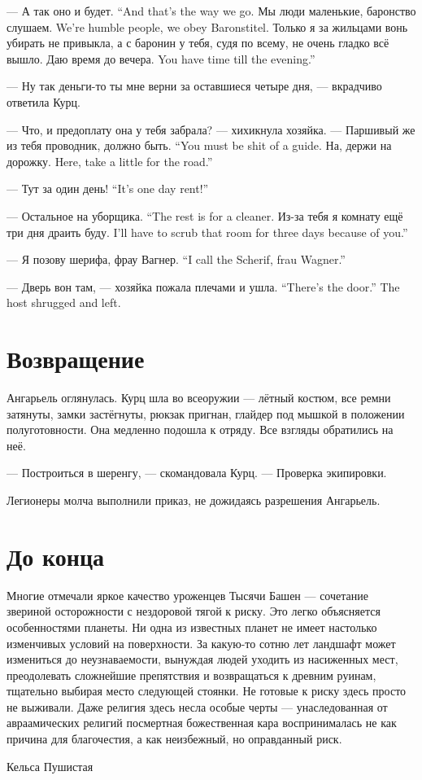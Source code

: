{--- А так оно и будет.}
{``And that's the way we go.}
{Мы люди маленькие, баронство слушаем.}
{We're humble people, we obey Baronstitel.}
Только я за жильцами вонь убирать не привыкла, а с баронин у тебя, судя по всему, не очень гладко всё вышло.
{Даю время до вечера.}
{You have time till the evening.''}

--- Ну так деньги-то ты мне верни за оставшиеся четыре дня, --- вкрадчиво ответила Курц.

--- Что, и предоплату она у тебя забрала? --- хихикнула хозяйка.
{--- Паршивый же из тебя проводник, должно быть.}
{``You must be shit of a guide.}
{На, держи на дорожку.}
{Here, take a little for the road.''}

{--- Тут за один день!}
{``It's one day rent!''}

{--- Остальное на уборщика.}
{``The rest is for a cleaner.}
{Из-за тебя я комнату ещё три дня драить буду.}
{I'll have to scrub that room for three days because of you.''}

{--- Я позову шерифа, фрау Вагнер.}
{``I call the Scherif, frau Wagner.''}

{--- Дверь вон там, --- хозяйка пожала плечами и ушла.}
{``There's the door.'' The host shrugged and left.}

\section{Возвращение}

Ангарьель оглянулась.
Курц шла во всеоружии --- лётный костюм, все ремни затянуты, замки застёгнуты, рюкзак пригнан, глайдер под мышкой в положении полуготовности.
Она медленно подошла к отряду.
Все взгляды обратились на неё.

--- Построиться в шеренгу, --- скомандовала Курц.
--- Проверка экипировки.

Легионеры молча выполнили приказ, не дожидаясь разрешения Ангарьель.

\section{До конца}

\epigraph{Многие отмечали яркое качество уроженцев Тысячи Башен --- сочетание звериной осторожности с нездоровой тягой к риску.
Это легко объясняется особенностями планеты.
Ни одна из известных планет не имеет настолько изменчивых условий на поверхности.
За какую-то сотню лет ландшафт может измениться до неузнаваемости, вынуждая людей уходить из насиженных мест, преодолевать сложнейшие препятствия и возвращаться к древним руинам, тщательно выбирая место следующей стоянки.
Не готовые к риску здесь просто не выживали.
Даже религия здесь несла особые черты --- унаследованная от авраамических религий посмертная божественная кара воспринималась не как причина для благочестия, а как неизбежный, но оправданный риск.
}{Кельса Пушистая}

